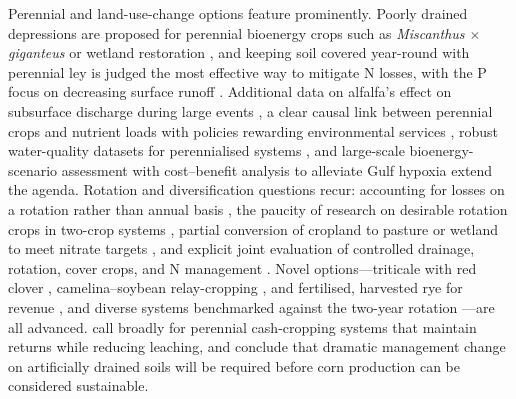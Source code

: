 Perennial and land-use-change options feature prominently. Poorly drained
depressions are proposed for perennial bioenergy crops such as
\textit{Miscanthus $\times$ giganteus} or wetland restoration \parencite{Huang2023},
and keeping soil covered year-round with perennial ley is judged the most
effective way to mitigate N losses, with the P focus on decreasing surface
runoff \parencite{Norberg2022}. Additional data on alfalfa's effect on subsurface
discharge during large events \parencite{Arrueta2025}, a clear causal link
between perennial crops and nutrient loads with policies rewarding environmental
services \parencite{Arrueta2022}, robust water-quality datasets for perennialised
systems \parencite{Wilson2023}, and large-scale bioenergy-scenario assessment
with cost--benefit analysis to alleviate Gulf hypoxia
\parencite{Guo2018,Woodbury2018} extend the agenda. Rotation and diversification
questions recur: accounting for losses on a rotation rather than annual basis
\parencite{Zhao2016}, the paucity of research on desirable rotation crops in
two-crop systems \parencite{Pasley2021}, partial conversion of cropland to
pasture or wetland to meet nitrate targets \parencite{Randall2001,Gowda2007,Nangia2008},
and explicit joint evaluation of controlled drainage, rotation, cover crops, and
N management \parencite{Ma2007b}. Novel options---triticale with red clover
\parencite{Nance2007}, camelina--soybean relay-cropping \parencite{Emmett2022},
and fertilised, harvested rye for revenue \parencite{Malone2018,Malone2023}, and
diverse systems benchmarked against the two-year rotation \parencite{Gentry2025}
---are all advanced. \textcite{Dinnes2002} call broadly for perennial cash-cropping
systems that maintain returns while reducing leaching, and \textcite{Jaynes2001}
conclude that dramatic management change on artificially drained soils will be
required before corn production can be considered sustainable.